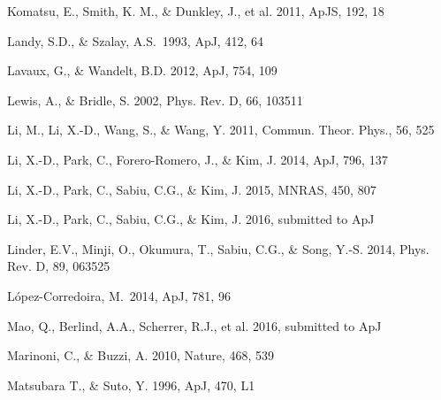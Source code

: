 \documentclass[iop]{emulateapj}
\begin{document}
\begin{thebibliography}{}
Komatsu, E., Smith, K. M., \& Dunkley, J., et al. 2011, ApJS, 192, 18  



Landy, S.D., \& Szalay, A.S.\ 1993, ApJ, 412, 64 


Lavaux, G., \& Wandelt, B.D. 2012, ApJ, 754, 109  


Lewis, A., \& Bridle, S. 2002, Phys. Rev. D, 66, 103511


Li, M., Li, X.-D., Wang, S., \& Wang, Y. 2011, Commun. Theor. Phys., 56, 525

Li, X.-D., Park, C., Forero-Romero, J., \& Kim, J. 2014, ApJ, 796, 137

Li, X.-D., Park, C., Sabiu, C.G., \& Kim, J. 2015, MNRAS, 450, 807 

Li, X.-D., Park, C., Sabiu, C.G., \& Kim, J. 2016, submitted to ApJ



Linder, E.V., Minji, O., Okumura, T., Sabiu, C.G., \& Song, Y.-S. 2014, Phys. Rev. D, 89, 063525  

L{\'o}pez-Corredoira, M.\ 2014, ApJ, 781, 96 

Mao, Q., Berlind, A.A., Scherrer, R.J., et al. 2016, submitted to ApJ

Marinoni, C., \& Buzzi, A. 2010, Nature, 468, 539  

Matsubara T., \& Suto, Y. 1996, ApJ, 470, L1  


\end{thebibliography}
\end{document}
